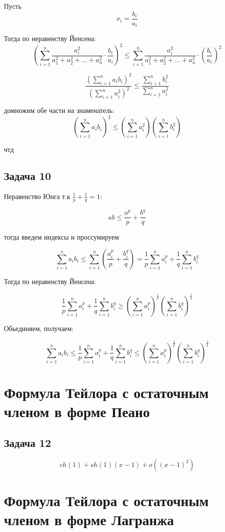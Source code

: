 \documentclass[a4paper,12pt]{article}
\begin{document}
Пусть
\[
x_i = \frac{b_i}{a_i}
\]

Тогда по неравенству Йенсена: 
\[
\left( \sum_{i=1}^n \frac{a_i^2}{a_1^2 + a_2^2 + \dots + a_n^2} \cdot \frac{b_i}{a_i} \right)^2 \leq \sum_{i=1}^n \frac{a_i^2}{a_1^2 + a_2^2 + \dots + a_n^2} \cdot \left( \frac{b_i}{a_i} \right)^2
\]

\[
\frac{\left( \sum_{i=1}^n a_i b_i \right)^2}{\left( \sum_{i=1}^n a_i^2 \right)^2} \leq \frac{\sum_{i=1}^n b_i^2}{\sum_{i=1}^n a_i^2}
\]

домножим обе части на знаменатель:
\[
\left( \sum_{i=1}^n a_i b_i \right)^2 \leq \left( \sum_{i=1}^n a_i^2 \right) \left( \sum_{i=1}^n b_i^2 \right)
\]

чтд

\subsection{Задача 10}
Неравенство Юнга т.к $\frac{1}{p} + \frac{1}{q} = 1$:

\[
ab \le \frac{a^p}{p} + \frac{b^q}{q}
\]

тогда введем индексы и проссумируем

\[
\sum_{i=1}^{n} a_i b_i \leq \sum_{i=1}^{n} \left( \frac{a_i^{p}}{p} + \frac{b_i^{q}}{q} \right) = \frac{1}{p} \sum_{i=1}^{n} a_i^{p} + \frac{1}{q} \sum_{i=1}^{n} b_i^{q}
\]

Тогда по неравенству Йенсена:

\[
\frac{1}{p} \sum_{i=1}^{n} a_i^{p} + \frac{1}{q} \sum_{i=1}^{n} b_i^{q} \geq \left( \sum_{i=1}^{n} a_i^{p} \right)^{\frac{1}{p}} \left( \sum_{i=1}^{n} b_i^{q} \right)^{\frac{1}{q}}
\]

Обьединяем, получаем:

\[
    \sum_{i=1}^{n} a_i b_i \leq \frac{1}{p} \sum_{i=1}^{n} a_i^{p} + \frac{1}{q} \sum_{i=1}^{n} b_i^{q} \leq \left( \sum_{i=1}^{n} a_i^{p} \right)^{\frac{1}{p}} \left( \sum_{i=1}^{n} b_i^{q} \right)^{\frac{1}{q}}
\]

\section{Формула Тейлора с остаточным членом в форме Пеано}
\subsection{Задача 12}

\[
ch(1) + sh(1)(x-1) + o((x-1)^2)
\]

\section{Формула Тейлора с остаточным членом в форме Лагранжа}
\end{document}
